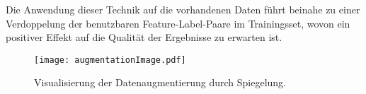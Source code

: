 Die Anwendung dieser Technik auf die vorhandenen Daten führt beinahe zu einer Verdoppelung 
der benutzbaren Feature-Label-Paare im Trainingsset, wovon ein positiver Effekt auf die Qualität der Ergebnisse zu erwarten ist.

\begin{figure}[hb]
	\centering
	\texttt{[image: augmentationImage.pdf]}
	\caption{Visualisierung der Datenaugmentierung durch Spiegelung.}
	\label{fig:dataAugm}
\end{figure}



















